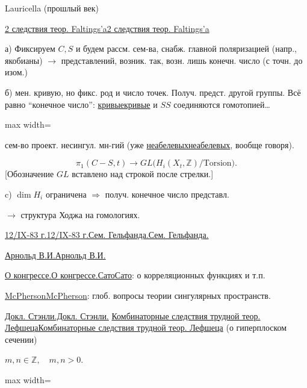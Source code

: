 \documentclass[11pt]{article}
\theoremstyle{definition}
\theoremstyle{remark}
\let\DiplomaticMathUnderline\underline
\renewcommand{\underline}[1]{\ifmmode\DiplomaticMathUnderline{#1}\else\uline{#1}\fi}
\begin{document}
Lauricella (прошлый век)

\underline{2 следствия теор. Faltings'a}

а) Фиксируем $C,S$ и будем рассм. сем-ва, снабж. главной поляризацией
(напр., якобианы)
$\longrightarrow$ представлений, возник. так, возн. лишь конечн. число
(с точн. до изом.)

б) мен. кривую, но фикс. род и число точек. Получ. предст. другой группы.
Всё равно ``конечное число'': \underline{кривые} и \underline{$S$} соединяются гомотопией\ldots

\begin{adjustbox}{max width=\linewidth}
\end{adjustbox}
\quad сем-во проект. несингул. мн-гий
(уже \underline{неабелевых}, вообще говоря).

\begin{equation*}
 \pi_1(C-S,t)\longrightarrow GL\bigl(H_i(X_t,\mathbb Z)/\text{Torsion}\bigr).
\end{equation*}
[Обозначение $GL$ вставлено над строкой после стрелки.]

c) $\dim H_i$ ограничена $\Longrightarrow$ получ. конечное число представл.

$\boldsymbol{\longrightarrow}$ структура Ходжа на гомологиях.

\underline{12/IX-83 г.}\quad \underline{Сем. Гельфанда.}

\underline{Арнольд В.И.}

\underline{О конгрессе.}\quad \underline{Сато}: о корреляционных функциях и т.п.

\underline{McPherson}: глоб. вопросы теории сингулярных пространств.

\underline{Докл. Стэнли.}\quad
\underline{Комбинаторные следствия трудной теор. Лефшеца}
(о гиперплоском сечении)

$m,n\in\mathbb Z,\quad m,n>0$.

\begin{adjustbox}{max width=\linewidth}
\end{adjustbox}
\end{document}
